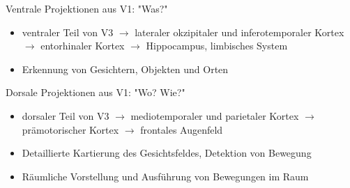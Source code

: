 \documentclass{beamer}
\begin{document}
    
\begin{frame}{Ventrale Projektionen aus V1: "Was?"}

\begin{itemize}
    \item 
    ventraler Teil von V3 \(\rightarrow\) lateraler okzipitaler und inferotemporaler Kortex \(\rightarrow\) entorhinaler Kortex \(\rightarrow\) Hippocampus, limbisches System 
    \item
    Erkennung von Gesichtern, Objekten und Orten
\end{itemize}



    
    
\end{frame}
    
    
\begin{frame}{Dorsale Projektionen aus V1: "Wo? Wie?"}

\begin{itemize}
    \item 
    dorsaler Teil von V3 \(\rightarrow\)  mediotemporaler und parietaler Kortex \(\rightarrow\) prämotorischer Kortex \(\rightarrow\) frontales Augenfeld
\item 
    Detaillierte Kartierung des Gesichtsfeldes, Detektion von Bewegung
        \item
    Räumliche Vorstellung und Ausführung von Bewegungen im Raum 
    
\end{itemize}

\end{frame}
\end{document}
